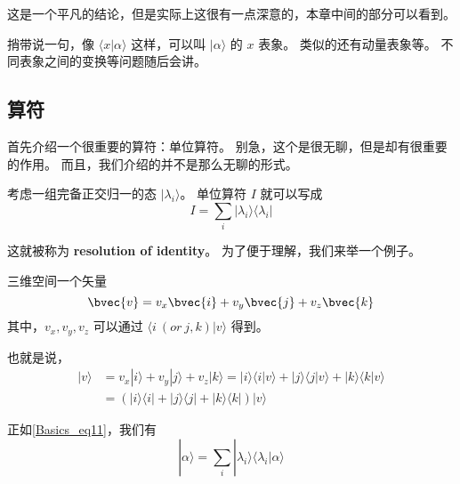 这是一个平凡的结论，但是实际上这很有一点深意的，本章中间的部分可以看到。

捎带说一句，像 $\langle x|\alpha\rangle$ 这样，可以叫 $|\alpha \rangle$ 的 $x$ 表象。 类似的还有动量表象等。 不同表象之间的变换等问题随后会讲。

\subsection{算符}

首先介绍一个很重要的算符：单位算符。 别急，这个是很无聊，但是却有很重要的作用。 而且，我们介绍的并不是那么无聊的形式。

考虑一组完备正交归一的态 $|\lambda_i\rangle$。 单位算符 $I$ 就可以写成
\begin{equation}\label{Basics_eq11}
I = \sum_i |\lambda_i\rangle\langle\lambda_i|
\end{equation}

这就被称为 \textbf{resolution of identity}。 为了便于理解，我们来举一个例子。

\begin{example}{}
三维空间一个矢量
\begin{equation}
\bvec{v} = v_x\bvec{i} + v_y\bvec{j} + v_z \bvec{k} 
\end{equation}
其中，$v_x, v_y, v_z$ 可以通过 $\langle i\ (or\ j, k)|v\rangle$ 得到。

也就是说，
\begin{equation}
\begin{split}
|v\rangle &= v_x|i\rangle + v_y|j\rangle + v_z|k\rangle = |i\rangle\langle i|v\rangle + |j\rangle\langle j|v\rangle + |k\rangle\langle k|v\rangle\\ &= (|i\rangle\langle i|+|j\rangle\langle j|+|k\rangle\langle k|)|v\rangle
\end{split}
\end{equation}
\end{example}{}
正如\autoref{Basics_eq11}，我们有
\begin{equation}
|\alpha\rangle = \sum_i |\lambda_i\rangle\langle\lambda_i|\alpha\rangle
\end{equation}

